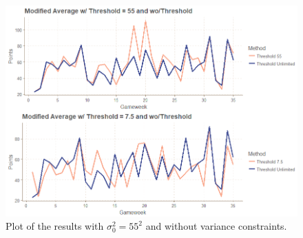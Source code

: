 \begin{figure}[H]
    \centering
    \includegraphics[scale=0.5]{fig/chapter_7/var_threshold.png}
    \caption{Plot of the results with $\sigma_0^{2} = 55^2$ and without variance constraints.}
\label{fig:performance_best_threshold}    
\end{figure}%
\newpar

\newpar

